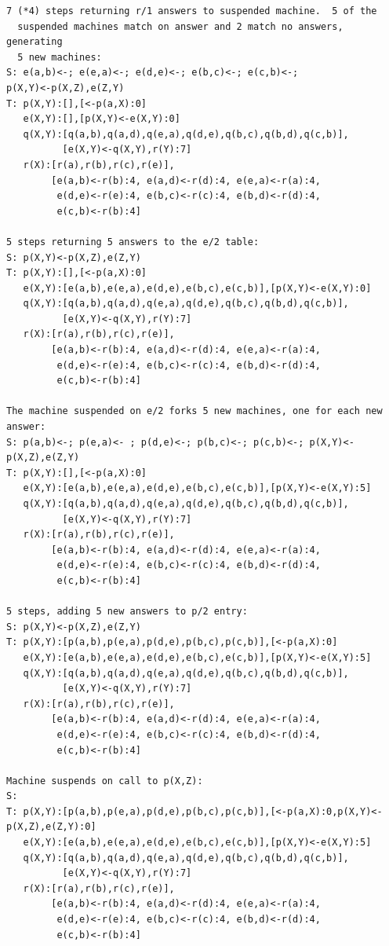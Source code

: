 \begin{verbatim}
7 (*4) steps returning r/1 answers to suspended machine.  5 of the
  suspended machines match on answer and 2 match no answers, generating
  5 new machines:
S: e(a,b)<-; e(e,a)<-; e(d,e)<-; e(b,c)<-; e(c,b)<-; 
p(X,Y)<-p(X,Z),e(Z,Y)
T: p(X,Y):[],[<-p(a,X):0]
   e(X,Y):[],[p(X,Y)<-e(X,Y):0]
   q(X,Y):[q(a,b),q(a,d),q(e,a),q(d,e),q(b,c),q(b,d),q(c,b)],
          [e(X,Y)<-q(X,Y),r(Y):7]
   r(X):[r(a),r(b),r(c),r(e)],
        [e(a,b)<-r(b):4, e(a,d)<-r(d):4, e(e,a)<-r(a):4,
         e(d,e)<-r(e):4, e(b,c)<-r(c):4, e(b,d)<-r(d):4,
         e(c,b)<-r(b):4]

5 steps returning 5 answers to the e/2 table:
S: p(X,Y)<-p(X,Z),e(Z,Y)
T: p(X,Y):[],[<-p(a,X):0]
   e(X,Y):[e(a,b),e(e,a),e(d,e),e(b,c),e(c,b)],[p(X,Y)<-e(X,Y):0]
   q(X,Y):[q(a,b),q(a,d),q(e,a),q(d,e),q(b,c),q(b,d),q(c,b)],
          [e(X,Y)<-q(X,Y),r(Y):7]
   r(X):[r(a),r(b),r(c),r(e)],
        [e(a,b)<-r(b):4, e(a,d)<-r(d):4, e(e,a)<-r(a):4,
         e(d,e)<-r(e):4, e(b,c)<-r(c):4, e(b,d)<-r(d):4,
         e(c,b)<-r(b):4]

The machine suspended on e/2 forks 5 new machines, one for each new answer:
S: p(a,b)<-; p(e,a)<- ; p(d,e)<-; p(b,c)<-; p(c,b)<-; p(X,Y)<-p(X,Z),e(Z,Y)
T: p(X,Y):[],[<-p(a,X):0]
   e(X,Y):[e(a,b),e(e,a),e(d,e),e(b,c),e(c,b)],[p(X,Y)<-e(X,Y):5]
   q(X,Y):[q(a,b),q(a,d),q(e,a),q(d,e),q(b,c),q(b,d),q(c,b)],
          [e(X,Y)<-q(X,Y),r(Y):7]
   r(X):[r(a),r(b),r(c),r(e)],
        [e(a,b)<-r(b):4, e(a,d)<-r(d):4, e(e,a)<-r(a):4,
         e(d,e)<-r(e):4, e(b,c)<-r(c):4, e(b,d)<-r(d):4,
         e(c,b)<-r(b):4]

5 steps, adding 5 new answers to p/2 entry:
S: p(X,Y)<-p(X,Z),e(Z,Y)
T: p(X,Y):[p(a,b),p(e,a),p(d,e),p(b,c),p(c,b)],[<-p(a,X):0]
   e(X,Y):[e(a,b),e(e,a),e(d,e),e(b,c),e(c,b)],[p(X,Y)<-e(X,Y):5]
   q(X,Y):[q(a,b),q(a,d),q(e,a),q(d,e),q(b,c),q(b,d),q(c,b)],
          [e(X,Y)<-q(X,Y),r(Y):7]
   r(X):[r(a),r(b),r(c),r(e)],
        [e(a,b)<-r(b):4, e(a,d)<-r(d):4, e(e,a)<-r(a):4,
         e(d,e)<-r(e):4, e(b,c)<-r(c):4, e(b,d)<-r(d):4,
         e(c,b)<-r(b):4]

Machine suspends on call to p(X,Z):
S: 
T: p(X,Y):[p(a,b),p(e,a),p(d,e),p(b,c),p(c,b)],[<-p(a,X):0,p(X,Y)<-p(X,Z),e(Z,Y):0]
   e(X,Y):[e(a,b),e(e,a),e(d,e),e(b,c),e(c,b)],[p(X,Y)<-e(X,Y):5]
   q(X,Y):[q(a,b),q(a,d),q(e,a),q(d,e),q(b,c),q(b,d),q(c,b)],
          [e(X,Y)<-q(X,Y),r(Y):7]
   r(X):[r(a),r(b),r(c),r(e)],
        [e(a,b)<-r(b):4, e(a,d)<-r(d):4, e(e,a)<-r(a):4,
         e(d,e)<-r(e):4, e(b,c)<-r(c):4, e(b,d)<-r(d):4,
         e(c,b)<-r(b):4]


\end{verbatim}
